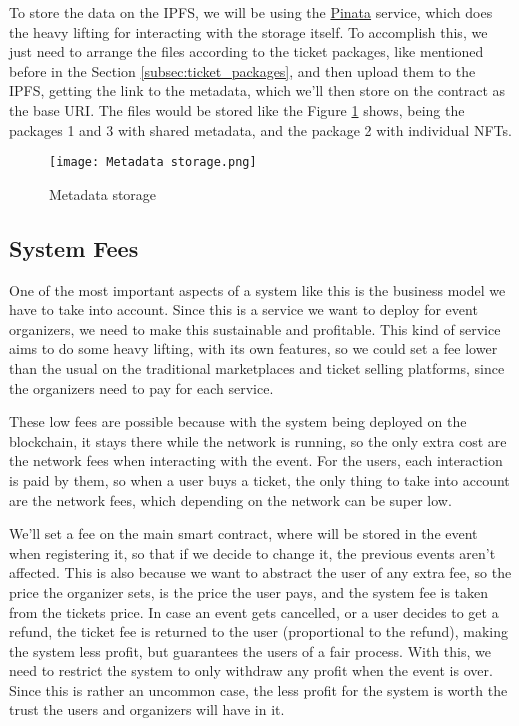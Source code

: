 To store the data on the IPFS, we will be using the \href{https://www.pinata.cloud/}{Pinata} service, which does the heavy lifting for interacting with the storage itself. To accomplish this, we just need to arrange the files according to the ticket packages, like mentioned before in the Section \ref{subsec:ticket_packages}, and then upload them to the IPFS, getting the link to the metadata, which we'll then store on the contract as the base URI. The files would be stored like the Figure \ref{fig:metadata_storage} shows, being the packages 1 and 3 with shared metadata, and the package 2 with individual NFTs.

\begin{figure}[H]
    \texttt{[image: Metadata storage.png]}
    \centering
    \caption{Metadata storage}
    \label{fig:metadata_storage}
\end{figure}

\subsection{System Fees}
\label{subsec:system_fees}

One of the most important aspects of a system like this is the business model we have to take into account. Since this is a service we want to deploy for event organizers, we need to make this sustainable and profitable. This kind of service aims to do some heavy lifting, with its own features, so we could set a fee lower than the usual on the traditional marketplaces and ticket selling platforms, since the organizers need to pay for each service.

These low fees are possible because with the system being deployed on the blockchain, it stays there while the network is running, so the only extra cost are the network fees when interacting with the event. For the users, each interaction is paid by them, so when a user buys a ticket, the only thing to take into account are the network fees, which depending on the network can be super low.

We'll set a fee on the main smart contract, where will be stored in the event when registering it, so that if we decide to change it, the previous events aren't affected. This is also because we want to abstract the user of any extra fee, so the price the organizer sets, is the price the user pays, and the system fee is taken from the tickets price. In case an event gets cancelled, or a user decides to get a refund, the ticket fee is returned to the user (proportional to the refund), making the system less profit, but guarantees the users of a fair process. With this, we need to restrict the system to only withdraw any profit when the event is over. Since this is rather an uncommon case, the less profit for the system is worth the trust the users and organizers will have in it.

